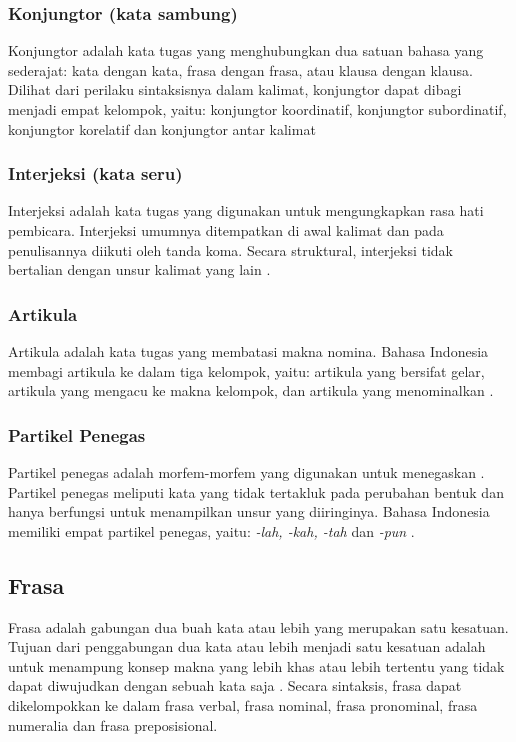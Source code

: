 \subsubsection{Konjungtor (kata sambung)}
Konjungtor adalah kata tugas yang menghubungkan dua satuan bahasa yang sederajat: kata dengan kata, frasa dengan frasa, atau klausa dengan klausa. Dilihat dari perilaku sintaksisnya dalam kalimat, konjungtor dapat dibagi menjadi empat kelompok, yaitu: konjungtor koordinatif, konjungtor subordinatif, konjungtor korelatif dan konjungtor antar kalimat \citep{alwi}

\subsubsection{Interjeksi (kata seru)}
Interjeksi adalah kata tugas yang digunakan untuk mengungkapkan rasa hati pembicara. Interjeksi umumnya ditempatkan di awal kalimat dan pada penulisannya diikuti oleh tanda koma. Secara struktural, interjeksi tidak bertalian dengan unsur kalimat yang lain \citep{alwi}.

\subsubsection{Artikula}
Artikula adalah kata tugas yang membatasi makna nomina. Bahasa Indonesia membagi artikula ke dalam tiga kelompok, yaitu: artikula yang bersifat gelar, artikula yang mengacu ke makna kelompok, dan artikula yang menominalkan \citep{alwi}.

\subsubsection{Partikel Penegas}
Partikel penegas adalah morfem-morfem yang digunakan untuk menegaskan \citep{chaer}. Partikel penegas meliputi kata yang tidak tertakluk pada perubahan bentuk dan hanya berfungsi untuk menampilkan unsur yang diiringinya. Bahasa Indonesia memiliki empat partikel penegas, yaitu: \emph{-lah, -kah, -tah} dan \emph{-pun} \citep{alwi}.

\subsection{Frasa}
Frasa adalah gabungan dua buah kata atau lebih yang merupakan satu kesatuan. Tujuan dari penggabungan dua kata atau lebih menjadi satu kesatuan adalah untuk menampung konsep makna yang lebih khas atau lebih tertentu yang tidak dapat diwujudkan dengan sebuah kata saja \citep{chaer}. Secara sintaksis, frasa dapat dikelompokkan ke dalam frasa verbal, frasa nominal, frasa pronominal, frasa numeralia dan frasa preposisional. 

